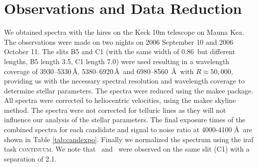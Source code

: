 \section{Observations and Data Reduction}
\label{sec:sn1572_hires:observ-data-reduct}

We obtained spectra with the \gls{hires} on the Keck 10m telescope on Mauna Kea. The observations were made on two nights on 2006 September 10 and 2006 October 11.  The slits B5 and C1 (with the same width of 0.86\arcsec\ but different lengths, B5 length 3.5\arcsec, C1 length 7.0\arcsec) were used resulting in a wavelength coverage of 3930--5330\,\AA, 5380--6920\,\AA\ and 6980--8560~\AA\ with $R\approx 50,000$, providing us with the necessary spectral resolution and wavelength coverage to determine stellar parameters. 
The spectra were reduced using the \gls{makee} package. All spectra were corrected to heliocentric velocities, using the \gls{makee} skyline method. The spectra were not corrected for telluric lines as they will not influence our analysis of the stellar parameters. The final exposure times of the combined spectra for each candidate and signal to noise ratio at 4000-4100 \AA\ are shown in Table \ref{tab:candexpo}. Finally we normalized the spectrum using the \gls{iraf} task \textsc{continuum}. We note that \starc\ and \stard\ were observed on the same slit (C1) with a separation of 2.1\arcsec.



